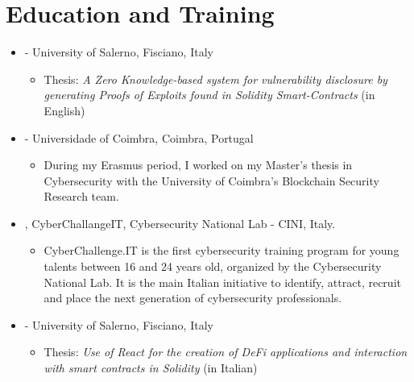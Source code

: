 \documentclass{color-cv}
\begin{document}
    \section{Education and Training}
    \begin{itemize}
      \item {} - University of Salerno, Fisciano, Italy
        \begin{itemize}
        \item Thesis: \textit{A Zero Knowledge-based system for
        vulnerability disclosure by generating
        Proofs of Exploits found in Solidity
        Smart-Contracts} (in English)
        \end{itemize}
    
    
      \item {} - Universidade of Coimbra, Coimbra, Portugal
      \begin{itemize}
          \item During my Erasmus period, I worked on my Master's thesis in Cybersecurity with the University of Coimbra's Blockchain Security Research team.
        \end{itemize}
        
        
    
    \item {}, CyberChallangeIT, Cybersecurity National Lab - CINI, Italy.
      \begin{itemize}
          \item CyberChallenge.IT is the first cybersecurity training program for young talents between 16 and 24 years old, organized by the Cybersecurity National Lab. It is the main Italian initiative to identify, attract, recruit and place the next generation of cybersecurity professionals.
    \end{itemize}
      
      
    \item {} - University of Salerno, Fisciano, Italy
        \begin{itemize}
          \item Thesis: \textit{Use of React for the creation of DeFi applications and interaction with smart contracts
    in Solidity} (in Italian)
        \end{itemize}
    \end{itemize}
    
\end{document}
